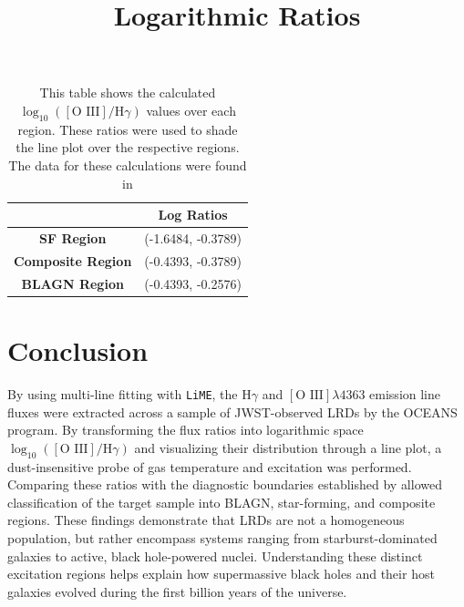 \documentclass[twoside,twocolumn,12pt]{article}
\begin{document}
\textit{
}


\begin{table}[htbp]
    \centering
    \title{Logarithmic Ratios}
    \label{tab:sample_table}
  
  \begin{tabular}{|c|c|}
    \hline
    \textbf{} & \textbf{Log Ratios} \\ \hline
    \textbf{SF Region} & (-1.6484, -0.3789) \\ \hline
    \textbf{Composite Region} & (-0.4393, -0.3789) \\ \hline
    \textbf{BLAGN Region} & (-0.4393, -0.2576) \\ \hline
  \end{tabular}
  
\vspace{2mm} %
    \caption {This table shows the calculated $\log_{10}([\text{O III}]/\text{H}\gamma)$ values over each region. These ratios were used to shade the line plot over the respective regions. The data for these calculations were found in \citet{Backhaus2025}}
\end{table}

\section{Conclusion}

By using multi-line fitting with \texttt{LiME}, the $\text{H}\gamma$ and $[\text{O III}] \lambda 4363$ emission line fluxes were extracted across a sample of JWST-observed LRDs by the OCEANS program. By transforming the flux ratios into logarithmic space $\log_{10}([\text{O III}]/\text{H}\gamma)$ and visualizing their distribution through a line plot, a dust-insensitive probe of gas temperature and excitation was performed.
Comparing these ratios with the diagnostic boundaries established by \citet{Backhaus2025} allowed classification of the target sample into BLAGN, star-forming, and composite regions. These findings demonstrate that LRDs are not a homogeneous population, but rather encompass systems ranging from starburst-dominated galaxies to active, black hole-powered nuclei. Understanding these distinct excitation regions helps explain how supermassive black holes and their host galaxies evolved during the first billion years of the universe.\textit{
}


\end{document}
